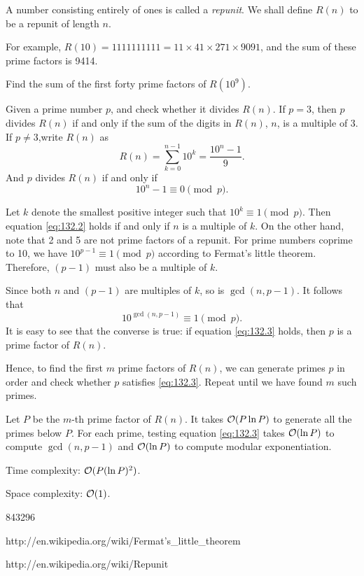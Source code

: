 




A number consisting entirely of ones is called a \emph{repunit}. We shall define $R(n)$ to be a repunit of length $n$.

For example, $R(10) = 1111111111 = 11 \times 41 \times 271 \times 9091$, and the sum of these prime factors is 9414.

Find the sum of the first forty prime factors of $R(10^9)$.

\solution

Given a prime number $p$, and check whether it divides $R(n)$. If $p=3$, then $p$ divides $R(n)$ if and only if the sum of the digits in $R(n)$, $n$, is a multiple of 3. If $p \ne 3$,write $R(n)$ as
\begin{equation}
R(n) = \sum_{k=0}^{n-1} 10^k = \frac{10^n-1}{9} .
\end{equation}
And $p$ divides $R(n)$ if and only if
\begin{equation}
10^n - 1 \equiv 0 \pmod{p} . \label{eq:132.2}
\end{equation}

Let $k$ denote the smallest positive integer such that $10^k \equiv 1 \pmod{p}$. Then equation \eqref{eq:132.2} holds if and only if $n$ is a multiple of $k$. On the other hand, note that 2 and 5 are not prime factors of a repunit. For prime numbers coprime to 10, we have $10^{p-1} \equiv 1 \pmod{p}$ according to Fermat's little theorem. Therefore, $(p-1)$ must also be a multiple of $k$.

Since both $n$ and $(p-1)$ are multiples of $k$, so is $\gcd(n,p-1)$. It follows that
\begin{equation}
10^{\gcd(n,p-1)} \equiv 1 \pmod{p} . \label{eq:132.3}
\end{equation}
It is easy to see that the converse is true: if equation \eqref{eq:132.3} holds, then $p$ is a prime factor of $R(n)$.

Hence, to find the first $m$ prime factors of $R(n)$, we can generate primes $p$ in order and check whether $p$ satisfies \eqref{eq:132.3}. Repeat until we have found $m$ such primes.

\complexity

Let $P$ be the $m$-th prime factor of $R(n)$. It takes $\mathcal{O}(P \ln P)$ to generate all the primes below $P$. For each prime, testing equation \eqref{eq:132.3} takes $\mathcal{O}(\ln P)$ to compute $\gcd(n,p-1)$ and $\mathcal{O}(\ln P)$ to compute modular exponentiation.

Time complexity: $\mathcal{O}(P (\ln P)^2)$.

Space complexity: $\mathcal{O}(1)$.

\answer

843296


http://en.wikipedia.org/wiki/Fermat's\_little\_theorem

http://en.wikipedia.org/wiki/Repunit


